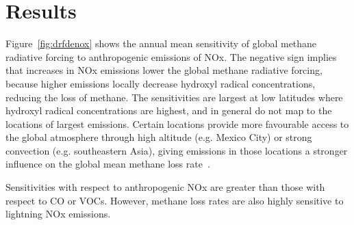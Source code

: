 \section{Results}

Figure~\ref{fig:drfdenox} shows the annual mean sensitivity of global methane radiative forcing to anthropogenic emissions of NOx. The negative sign implies that increases in NOx emissions lower the global methane radiative forcing, because higher emissions locally decrease hydroxyl radical concentrations, reducing the loss of methane. The sensitivities are largest at low latitudes where hydroxyl radical concentrations are highest, and in general do not map to the locations of largest emissions. Certain locations provide more favourable access to the global atmosphere through high altitude (e.g. Mexico City) or strong convection (e.g. southeastern Asia), giving emissions in those locations a stronger influence on the global mean methane loss rate~\citep{ref:bowman2012}.

Sensitivities with respect to anthropogenic NOx are greater than those with respect to CO or VOCs. However, methane loss rates are also highly sensitive to lightning NOx emissions.

